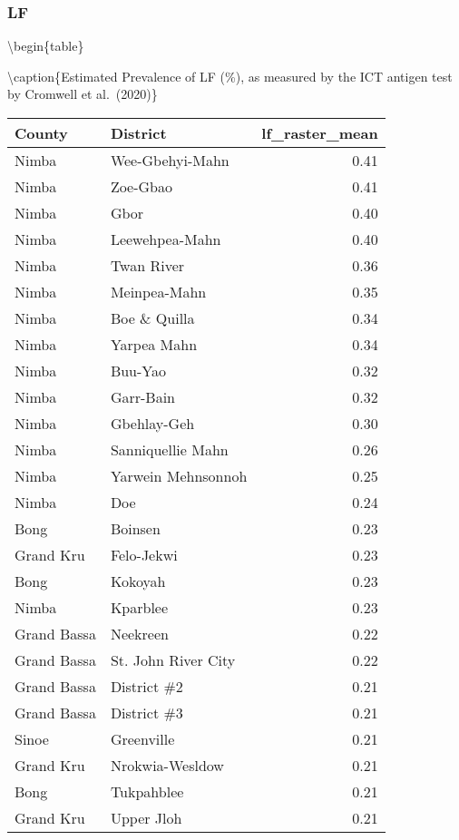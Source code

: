 \documentclass[
]{article}
\begin{document}
\hypertarget{lf}{%
\subsubsection{LF}\label{lf}}

\textbackslash begin\{table\}

\textbackslash caption\{\label{tab:lf}Estimated Prevalence of LF (\%), as measured by the ICT antigen test by Cromwell et al.~(2020)\}
\centering

\begin{tabular}[t]{l|l|r}
\hline
County & District & lf\_raster\_mean\\
\hline
Nimba & Wee-Gbehyi-Mahn & 0.41\\
\hline
Nimba & Zoe-Gbao & 0.41\\
\hline
Nimba & Gbor & 0.40\\
\hline
Nimba & Leewehpea-Mahn & 0.40\\
\hline
Nimba & Twan River & 0.36\\
\hline
Nimba & Meinpea-Mahn & 0.35\\
\hline
Nimba & Boe \& Quilla & 0.34\\
\hline
Nimba & Yarpea Mahn & 0.34\\
\hline
Nimba & Buu-Yao & 0.32\\
\hline
Nimba & Garr-Bain & 0.32\\
\hline
Nimba & Gbehlay-Geh & 0.30\\
\hline
Nimba & Sanniquellie Mahn & 0.26\\
\hline
Nimba & Yarwein Mehnsonnoh & 0.25\\
\hline
Nimba & Doe & 0.24\\
\hline
Bong & Boinsen & 0.23\\
\hline
Grand Kru & Felo-Jekwi & 0.23\\
\hline
Bong & Kokoyah & 0.23\\
\hline
Nimba & Kparblee & 0.23\\
\hline
Grand Bassa & Neekreen & 0.22\\
\hline
Grand Bassa & St. John River City & 0.22\\
\hline
Grand Bassa & District \#2 & 0.21\\
\hline
Grand Bassa & District \#3 & 0.21\\
\hline
Sinoe & Greenville & 0.21\\
\hline
Grand Kru & Nrokwia-Wesldow & 0.21\\
\hline
Bong & Tukpahblee & 0.21\\
\hline
Grand Kru & Upper Jloh & 0.21\\

\end{tabular}
\end{document}
